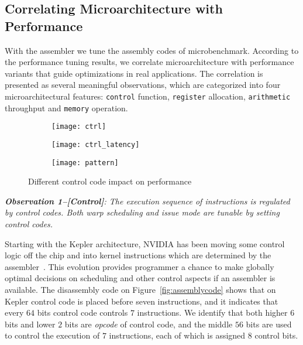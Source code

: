\subsection{Correlating Microarchitecture with Performance}
\label{sec:benchmark}


With the assembler we tune the assembly codes of microbenchmark. According to the performance tuning results, we correlate microarchitecture with performance variants that guide optimizations in real applications. The correlation is presented as several meaningful observations, which are categorized into four microarchitectural features:  {\tt control} function, {\tt register} allocation, {\tt arithmetic} throughput and {\tt memory} operation.
    \begin{figure*}
        \begin{subfigure}[htbp]{0.3\textwidth}
            \texttt{[image: ctrl]}
            \label{fig:control_throughput}
        \end{subfigure}
        \begin{subfigure}[htbp]{0.3\textwidth}
            \texttt{[image: ctrl\_latency]}
            \label{fig:control_latency}
        \end{subfigure}
        \begin{subfigure}[htbp]{0.3\textwidth}
            \texttt{[image: pattern]}
            \label{fig:control_pattern}
        \end{subfigure}
        \caption{Different control code impact on performance}\label{fig:control_code}
    \end{figure*}


{\em {\bf Observation 1--[Control]}: The execution sequence of instructions is regulated by control codes. Both warp scheduling and issue mode are tunable by setting control codes.}

Starting with the Kepler architecture, NVIDIA has been moving some control logic off the chip and into kernel instructions which are determined by the assembler~\cite{lai,maxas}. This evolution provides programmer a chance to make globally optimal decisions on scheduling and other control aspects if an assembler is available. The disassembly code on Figure~\ref{fig:assemblycode} shows that on Kepler control code is placed before seven instructions, and it indicates that every $64$ bits control code controls $7$ instructions. We identify that both higher $6$ bits and lower $2$ bits are {\em opcode} of control code, and the middle $56$ bits are used to control the execution of $7$ instructions, each of which is assigned $8$ control bits.

